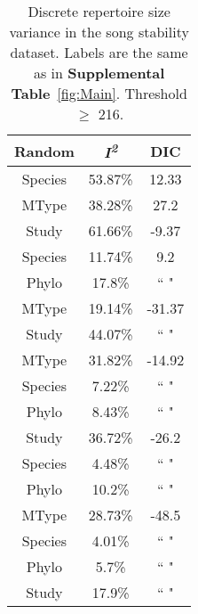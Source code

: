 \documentclass{article}
\begin{document}
  \begin{table}[H]
  \centering
  \caption{Discrete repertoire size variance in the song stability dataset. Labels are the same as in \textbf{Supplemental Table}~\ref{fig:Main}. Threshold $\ge$ 216.} 
  \begin{tabular}{ccc}
  \hline
  Random & \textit{I\textsuperscript{2}} & DIC \\ 
  \hline
  Species & 53.87\% & 12.33 \\ \hdashline
  MType & 38.28\% & 27.2 \\ \hdashline
  Study & 61.66\% & -9.37 \\ \hdashline
  Species & 11.74\% & 9.2 \\ 
  Phylo & 17.8\% & `` " \\ \hdashline
  MType & 19.14\% & -31.37 \\ 
  Study & 44.07\% & `` " \\ \hdashline
  MType & 31.82\% & -14.92 \\ 
  Species & 7.22\% & `` " \\ 
  Phylo & 8.43\% & `` " \\ \hdashline
  Study & 36.72\% & -26.2 \\ 
  Species & 4.48\% & `` " \\ 
  Phylo & 10.2\% & `` " \\ \hdashline
  MType & 28.73\% & -48.5 \\ 
  Species & 4.01\% & `` " \\ 
  Phylo & 5.7\% & `` " \\ 
  Study & 17.9\% & `` " \\ 
  \hline
  \end{tabular}
  \end{table}
\end{document}
